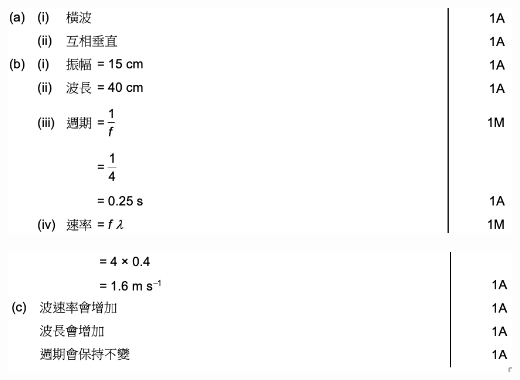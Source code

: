 {}{
    \sol
    \par{\par\centering\includegraphics[width=\textwidth]{./img/ch1prob_2024-05-13-12-45-26.png}\par}
    \par{\par\centering\includegraphics[width=\textwidth]{./img/ch1_earlyclass_wave_lq_2024-05-13-13-01-04.png}\par}
}

